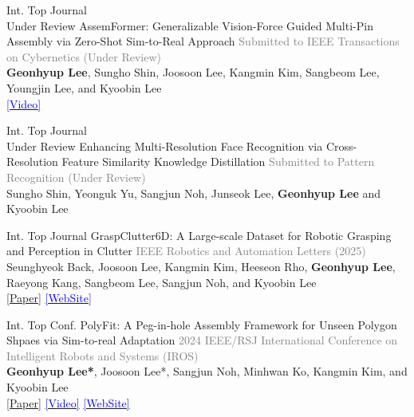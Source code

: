 \documentclass[9pt]{developercv} %
\begin{document}
{\begin{entrylist}
    \entry
        {Int. Top Journal\\Under Review}
        {AssemFormer: Generalizable Vision-Force Guided Multi-Pin Assembly via Zero-Shot Sim-to-Real Approach} 
        {}
        {\vspace{0pt}
        \textcolor{gray}{Submitted to IEEE Transactions on Cybernetics (Under Review)} \\
        \textbf{Geonhyup Lee}, Sungho Shin, Joosoon Lee, Kangmin Kim, Sangbeom Lee, Youngjin Lee, and Kyoobin Lee \\
         \href{https://youtu.be/ONNxIl9NiPQ}{\textcolor{blue}{[Video]}}
        }

    \entry
        {Int. Top Journal\\Under Review}
        {Enhancing Multi-Resolution Face Recognition via Cross-Resolution Feature Similarity Knowledge Distillation} 
        {}
        {\vspace{0pt}
        \textcolor{gray}{Submitted to Pattern Recognition (Under Review)} \\
        Sungho Shin, Yeonguk Yu, Sangjun Noh, Junseok Lee, \textbf{Geonhyup Lee} and Kyoobin Lee \\
        }

    \entry
        {Int. Top Journal}
        {GraspClutter6D: A Large-scale Dataset for Robotic Grasping and Perception in Clutter} 
        {}
        {\vspace{0pt}
        \textcolor{gray}{IEEE Robotics and Automation Letters (2025)} \\
        Seunghyeok Back, Joosoon Lee, Kangmin Kim, Heeseon Rho, \textbf{Geonhyup Lee}, Raeyong Kang, Sangbeom Lee, Sangjun Noh, and Kyoobin Lee \\
       \textcolor{blue}{\href{https://arxiv.org/pdf/2504.06866?}{[Paper]}} 
       \href{https://sites.google.com/view/graspclutter6d}{\textcolor{blue}{[WebSite]}}
        }

    \entry
        {Int. Top Conf.}
        {PolyFit: A Peg-in-hole Assembly Framework for Unseen Polygon Shpaes via Sim-to-real Adaptation} 
        {}
        {\vspace{0pt}
        \textcolor{gray}{2024 IEEE/RSJ International Conference on Intelligent Robots and Systems (IROS)} \\
        \textbf{Geonhyup Lee*}, Joosoon Lee*, Sangjun Noh, Minhwan Ko, Kangmin Kim, and Kyoobin Lee \\
        \textcolor{blue}{\href{https://ieeexplore.ieee.org/abstract/document/10802554}{[Paper]}} 
         \href{https://youtu.be/1HlAXLuObnI}{\textcolor{blue}{[Video]}}
         \href{https://sites.google.com/view/polyfit-peginhole}{\textcolor{blue}{[WebSite]}}
        }
        

\end{entrylist}}
\end{document}
